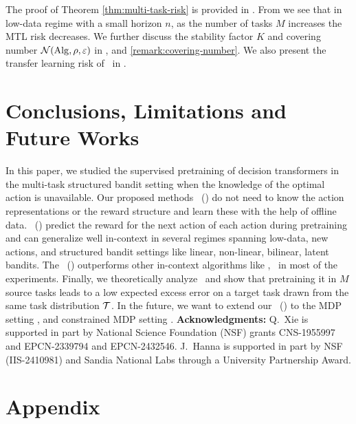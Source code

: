 \documentclass[10pt]{article}
\theoremstyle{plain}
\theoremstyle{definition}
\theoremstyle{remark}
\begin{document}
The proof of Theorem \ref{thm:multi-task-risk} is provided in .
From  we see that in low-data regime with a small horizon $n$, as the number of tasks $M$ increases the MTL risk decreases. We further discuss the stability factor $K$ and covering number $\mathcal{N}(\mathrm{Alg}, \rho, \varepsilon)$ in , and \ref{remark:covering-number}. We also present the transfer learning risk of \predt\ in .
\vspace*{-1.0em}
\section{Conclusions, Limitations and Future Works}
\label{sec:conc}
\vspace*{-0.7em}
In this paper, we studied the supervised pretraining of decision transformers in the multi-task structured bandit setting when the knowledge of the optimal action is unavailable.
Our proposed methods \pred\ (\gt) do not need to know the action representations or the reward structure and learn these with the help of offline data.
\pred\ (\gt) predict the reward for the next action of each action during pretraining and can generalize well in-context in several regimes spanning low-data, new actions, and structured bandit settings like linear, non-linear, bilinear, latent bandits. The \pred\ (\gt) outperforms other in-context algorithms like \ad, \dptg\ in most of the experiments. Finally, we theoretically analyze \predt\ and show that pretraining it in $M$ source tasks leads to a low expected excess error on a target task drawn from the same task distribution $\mathcal{T}$.
In the future, we want to extend our \pred\ (\gt) to the MDP setting \citep{sutton2018reinforcement, agarwal2019reinforcement}, and constrained MDP setting \citep{efroni2020exploration, gu2022review}.
\textbf{Acknowledgments:} Q.\ Xie is supported in part by National Science Foundation (NSF) grants CNS-1955997 and EPCN-2339794 and EPCN-2432546. J.\ Hanna is supported in part by NSF (IIS-2410981) and Sandia National Labs through a University Partnership Award.


\appendix
\onecolumn
\section{Appendix}
\label{sec:appendix}
\end{document}

